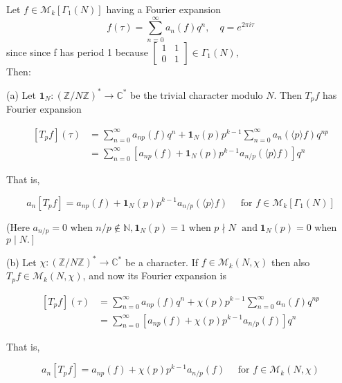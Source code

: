  \begin{proposition}\label{3.1.10}
     Let $f \in \mathcal{M}_{k}\left[\Gamma_{1}(N)\right]$ having a Fourier expansion 
$$
f(\tau)=\sum_{n=0}^{\infty} a_{n}(f) q^{n}, \quad q=e^{2 \pi i \tau}
$$ since since f  has period 1 because $\left[\begin{array}{ll}1 & 1 \\ 0 & 1\end{array}\right] \in \Gamma_{1}(N),$ \\
Then:

(a) Let $\mathbf{1}_{N}:(\mathbb{Z} / N \mathbb{Z})^{*} \longrightarrow \mathbb{C}^{*}$ be the trivial character modulo $N$. Then $T_{p} f$ has Fourier expansion

$$
\begin{aligned}
\left[T_{p} f\right](\tau) & =\sum_{n=0}^{\infty} a_{n p}(f) q^{n}+\mathbf{1}_{N}(p) p^{k-1} \sum_{n=0}^{\infty} a_{n}(\langle p\rangle f) q^{n p} \\
& =\sum_{n=0}^{\infty}\left[a_{n p}(f)+\mathbf{1}_{N}(p) p^{k-1} a_{n / p}(\langle p\rangle f)\right] q^{n}
\end{aligned}
$$

That is,

$$
a_{n}\left[T_{p} f\right]=a_{n p}(f)+\mathbf{1}_{N}(p) p^{k-1} a_{n / p}(\langle p\rangle f) \quad \text { for } f \in \mathcal{M}_{k}\left[\Gamma_{1}(N)\right]
$$

(Here $a_{n / p}=0$ when $n / p \notin \mathbb{N}$$,\mathbf{1}_{N}(p)=1$ when $p \nmid N$ $\operatorname{and} \mathbf{1}_{N}(p)=0$ when $\left.p \mid N.\right]$

(b) Let $\chi:(\mathbb{Z} / N \mathbb{Z})^{*} \longrightarrow \mathbb{C}^{*}$ be a character. If $f \in \mathcal{M}_{k}(N, \chi)$ then also $T_{p} f \in \mathcal{M}_{k}(N, \chi)$, and now its Fourier expansion is

$$
\begin{aligned}
\left[T_{p} f\right](\tau) & =\sum_{n=0}^{\infty} a_{n p}(f) q^{n}+\chi(p) p^{k-1} \sum_{n=0}^{\infty} a_{n}(f) q^{n p} \\
& =\sum_{n=0}^{\infty}\left[a_{n p}(f)+\chi(p) p^{k-1} a_{n / p}(f)\right] q^{n}
\end{aligned}
$$

That is,

$$
a_{n}\left[T_{p} f\right]=a_{n p}(f)+\chi(p) p^{k-1} a_{n / p}(f) \quad \text { for } f \in \mathcal{M}_{k}(N, \chi)
$$

 \end{proposition}
